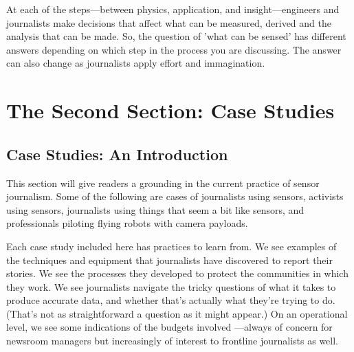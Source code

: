 At each of the steps—between physics, application, and insight—engineers
and journalists make decisions that affect what can be measured,
derived and the analysis that can be made. So, the question of 'what can be
sensed' has different answers depending on which step in the process you
are discussing. The answer can also change as journalists apply effort
and immagination.


\part{The Second Section: Case Studies}


\chapter{Case Studies: An Introduction}
This section will give readers a grounding in the current practice of sensor
journalism. Some of the following are cases of journalists using sensors,
activists using sensors, journalists using things that seem a bit like sensors,
and professionals piloting flying robots with camera payloads.

Each case study included here has practices to learn from. We see examples
of the techniques and equipment that journalists have discovered to report
their stories. We see the processes they developed to protect the communities
in which they work. We see journalists navigate the tricky questions
of what it takes to produce accurate data, and whether that's actually what
they're trying to do. (That's not as straightforward a question as it might
appear.) On an operational level, we see some indications of the budgets
involved —always of concern for newsroom managers but increasingly of
interest to frontline journalists as well.


